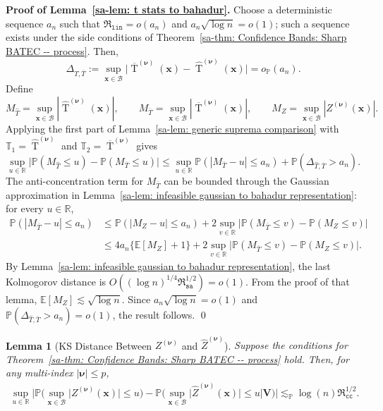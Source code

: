 \documentclass[10pt]{article}
\newtheorem{lem}{Lemma}
\DeclareMathOperator{\Tstat}{T}
\renewcommand{\P}{\mathbb{P}}
\newcommand{\E}{\mathbb{E}}
\newcommand{\reals}{\mathbb{R}}
\newcommand{\lessp}{\lesssim_{\mathbb{P}}}
\newcommand{\bV}{\mathbf{V}}
\newcommand{\bx}{\mathbf{x}}
\newcommand{\bnu}{\boldsymbol{\nu}}
\newcommand{\B}{\mathcal{B}}
\begin{document}
\noindent\textbf{Proof of Lemma~\ref{sa-lem: t stats to bahadur}.} Choose a deterministic sequence $a_n$ such that $\mathfrak{R}_{\mathtt{lin}}=o(a_n)$ and $a_n\sqrt{\log n}=o(1)$; such a sequence exists under the side conditions of Theorem~\ref{sa-thm: Confidence Bands: Sharp BATEC -- process}. Then,
\[
    \Delta_{\widehat T,\overline T}
    :=
    \sup_{\bx \in \B} \big|\overline{\Tstat}^{(\bnu)}(\bx) - \widehat{\Tstat}^{(\bnu)}(\bx)\big|
    =
    o_{\P}(a_n).
\]
Define
\[
    M_{\widehat T}=\sup_{\bx\in\B}|\widehat{\Tstat}^{(\bnu)}(\bx)|,
    \qquad
    M_{\overline T}=\sup_{\bx\in\B}|\overline{\Tstat}^{(\bnu)}(\bx)|,
    \qquad
    M_Z=\sup_{\bx\in\B}|Z^{(\bnu)}(\bx)|.
\]
Applying the first part of Lemma~\ref{sa-lem: generic suprema comparison} with $\mathbb{T}_1=\widehat{\Tstat}^{(\bnu)}$ and $\mathbb{T}_2=\overline{\Tstat}^{(\bnu)}$ gives
\[
    \sup_{u\in\reals}\big|\P(M_{\widehat T}\le u)-\P(M_{\overline T}\le u)\big|
    \le
    \sup_{u\in\reals}\P(|M_{\overline T}-u|\le a_n)
    +\P(\Delta_{\widehat T,\overline T}>a_n).
\]
The anti-concentration term for $M_{\overline T}$ can be bounded through the Gaussian approximation in Lemma~\ref{sa-lem: infeasible gaussian to bahadur representation}: for every $u\in\reals$,
\begin{align*}
    \P(|M_{\overline T}-u|\le a_n)
    &\le
    \P(|M_Z-u|\le a_n)
    +2\sup_{v\in\reals}\big|\P(M_{\overline T}\le v)-\P(M_Z\le v)\big| \\
    &\le
    4a_n\{\E[M_Z]+1\}
    +2\sup_{v\in\reals}\big|\P(M_{\overline T}\le v)-\P(M_Z\le v)\big|.
\end{align*}
By Lemma~\ref{sa-lem: infeasible gaussian to bahadur representation}, the last Kolmogorov distance is $O((\log n)^{1/4}\mathfrak{R}_{\mathtt{sa}}^{1/2})=o(1)$. From the proof of that lemma, $\E[M_Z]\lesssim\sqrt{\log n}$. Since $a_n\sqrt{\log n}=o(1)$ and $\P(\Delta_{\widehat T,\overline T}>a_n)=o(1)$, the result follows.
\qed


\begin{lem}[KS Distance Between $Z^{(\bnu)}$ and $\widehat{Z}^{(\bnu)}$]\label{sa-lem: feasible gaussian to infeasible gaussian}
Suppose the conditions for Theorem~\ref{sa-thm: Confidence Bands: Sharp BATEC -- process} hold. Then, for any multi-index $|\bnu| \leq p$,
\begin{align*}
    \sup_{u \in \reals} \Big|\P \Big(\sup_{\bx \in \B} \big|Z^{(\bnu)}(\bx)\big| \leq u \Big)
                             - \P \Big(\sup_{\bx \in \B} \big|\widehat{Z}^{(\bnu)}(\bx) \big| \leq u \big| \bV \Big) \Big|
    \lessp \log(n)\mathfrak{R}_{\mathtt{cc}}^{1/2}.
\end{align*}
\end{lem}
\end{document}
